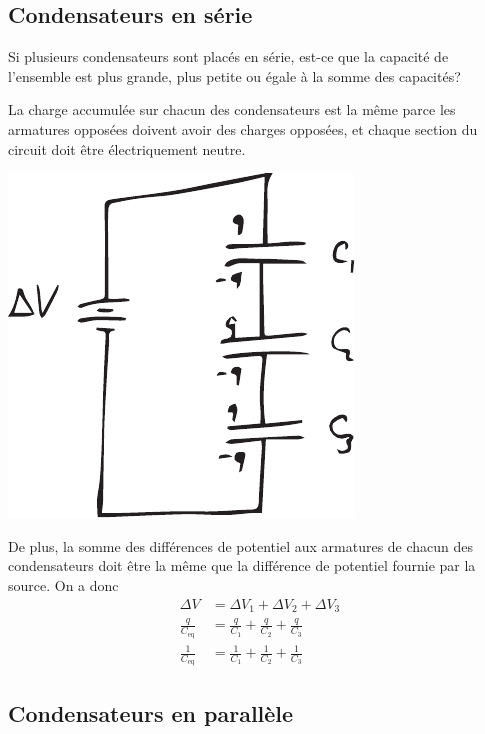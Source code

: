 
\subsection*{Condensateurs en série}


Si plusieurs condensateurs sont placés en série, est-ce que la capacité de
l'ensemble est plus grande, plus petite ou égale à la somme des capacités?

La charge accumulée sur chacun des condensateurs est la même parce les
armatures opposées doivent avoir des charges opposées, et chaque section du
circuit doit être électriquement neutre.

\begin{center}
  \includegraphics[scale=0.5]{07-condensateurs/figures/condensateur-serie.pdf}
\end{center}

De plus, la somme des différences de potentiel aux armatures de chacun des
condensateurs doit être la même que la différence de potentiel fournie par la
source. On a donc
\begin{align*}
  \Delta V &= \Delta V_1 + \Delta V_2 + \Delta V_3  \\
  \frac{q}{C_\mathrm{eq}} &= \frac{q}{C_1} + \frac{q}{C_2} + \frac{q}{C_3}  \\
  \frac{1}{C_\mathrm{eq}} &= \frac{1}{C_1} + \frac{1}{C_2} + \frac{1}{C_3}
\end{align*}



\subsection*{Condensateurs en parallèle}

